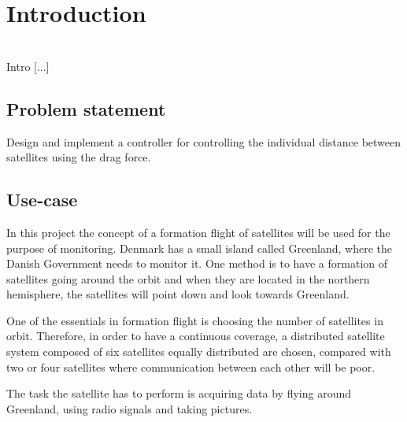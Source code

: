 \chapter{Introduction}\label{chap:Introduction}
\cite{Biezl}\\
\cite{SADC}
Intro [...]

\section{Problem statement}
Design and implement a controller for controlling the individual distance between satellites using the drag force.
\section{Use-case}\label{sec:useCase}
In this project the concept of a formation flight of satellites will be used for the purpose of monitoring. Denmark has a small island called Greenland, where the Danish Government needs to monitor it. One method is to have a formation of satellites going around the orbit and when they are located in the northern hemisphere, the satellites will point down and look towards Greenland. 

One of the essentials in formation flight is choosing the number of satellites in orbit. Therefore, in order to have a continuous coverage, a distributed satellite system composed of six satellites equally distributed are chosen, compared with two or four satellites where communication between each other will be poor.

The task the satellite has to perform is acquiring data by flying around Greenland, using radio signals and taking pictures.

